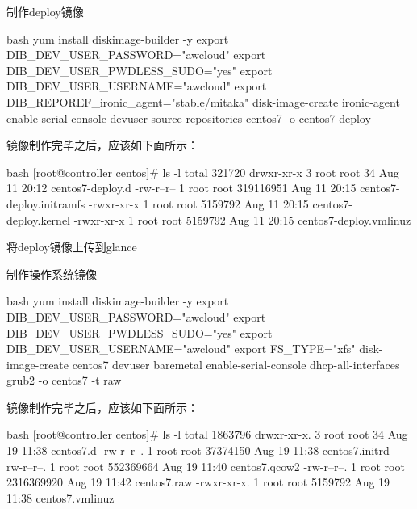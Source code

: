 制作deploy镜像
\begin{code-block}{bash}
yum install diskimage-builder -y
export DIB_DEV_USER_PASSWORD="awcloud"
export DIB_DEV_USER_PWDLESS_SUDO="yes"
export DIB_DEV_USER_USERNAME="awcloud"
export DIB_REPOREF_ironic_agent="stable/mitaka"
disk-image-create ironic-agent enable-serial-console devuser source-repositories centos7 -o centos7-deploy
\end{code-block}
镜像制作完毕之后，应该如下面所示：
\begin{code-block}{bash}
[root@controller centos]# ls -l
total 321720
drwxr-xr-x 3 root root        34 Aug 11 20:12 centos7-deploy.d
-rw-r--r-- 1 root root 319116951 Aug 11 20:15 centos7-deploy.initramfs
-rwxr-xr-x 1 root root   5159792 Aug 11 20:15 centos7-deploy.kernel
-rwxr-xr-x 1 root root   5159792 Aug 11 20:15 centos7-deploy.vmlinuz
\end{code-block}

将deploy镜像上传到glance

制作操作系统镜像
\begin{code-block}{bash}
yum install diskimage-builder -y
export DIB_DEV_USER_PASSWORD="awcloud"
export DIB_DEV_USER_PWDLESS_SUDO="yes"
export DIB_DEV_USER_USERNAME="awcloud"
export FS_TYPE="xfs"
disk-image-create centos7 devuser baremetal enable-serial-console dhcp-all-interfaces grub2 -o centos7 -t raw
\end{code-block}

镜像制作完毕之后，应该如下面所示：
\begin{code-block}{bash}
[root@controller centos]# ls -l
total 1863796
drwxr-xr-x. 3 root root         34 Aug 19 11:38 centos7.d
-rw-r--r--. 1 root root   37374150 Aug 19 11:38 centos7.initrd
-rw-r--r--. 1 root root  552369664 Aug 19 11:40 centos7.qcow2
-rw-r--r--. 1 root root 2316369920 Aug 19 11:42 centos7.raw
-rwxr-xr-x. 1 root root    5159792 Aug 19 11:38 centos7.vmlinuz
\end{code-block}


